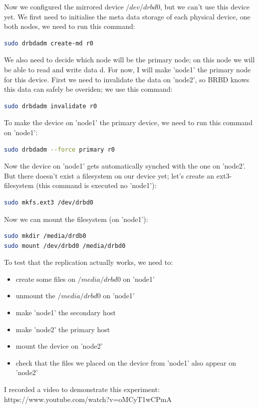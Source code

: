 \documentclass[12pt]{report}
\begin{document}
Now we configured the mirrored device $/dev/drbd0$, but we can't use
this device yet.
We first need to initialise the meta data storage of each physical
device,
one both nodes, we need to run this command:
\begin{lstlisting}[language=bash]
sudo drbdadm create-md r0
\end{lstlisting}
We also need to decide which node will be the primary node; on this
node we will be able to read and write data d.
For now, I will make 'node1' the primary node for this device.
First we need to invalidate the data on 'node2', so BRBD knows this
data can safely be overiden; we use this command:
\begin{lstlisting}[language=bash]
sudo drbdadm invalidate r0
\end{lstlisting}
To make the device on 'node1' the primary device,
we need to run this command on 'node1':
\begin{lstlisting}[language=bash]
sudo drbdadm --force primary r0
\end{lstlisting}
Now the device on 'node1' gets automatically synched with the one on
'node2'. But there doesn't exist a filesystem on our device yet; let's
create an ext3-filesystem (this command is executed no 'node1'):
\begin{lstlisting}[language=bash]
sudo mkfs.ext3 /dev/drbd0
\end{lstlisting}
Now we can mount the filesystem (on 'node1'):
\begin{lstlisting}[language=bash]
sudo mkdir /media/drdb0
sudo mount /dev/drbd0 /media/drbd0 
\end{lstlisting}
To test that the replication actually works, we need to:
\begin{itemize}
\item create some files on $/media/drbd0$ on 'node1'
\item unmount the $/media/drbd0$ on 'node1'
\item make 'node1' the secondary host
\item make 'node2' the primary host
\item mount the device on 'node2'
\item check that the files we placed on the device from 'node1' also
  appear on 'node2'
\end{itemize}

I recorded a video to demonstrate this experiment:\\
https://www.youtube.com/watch?v=oMCyT1wCPmA
\end{document}
